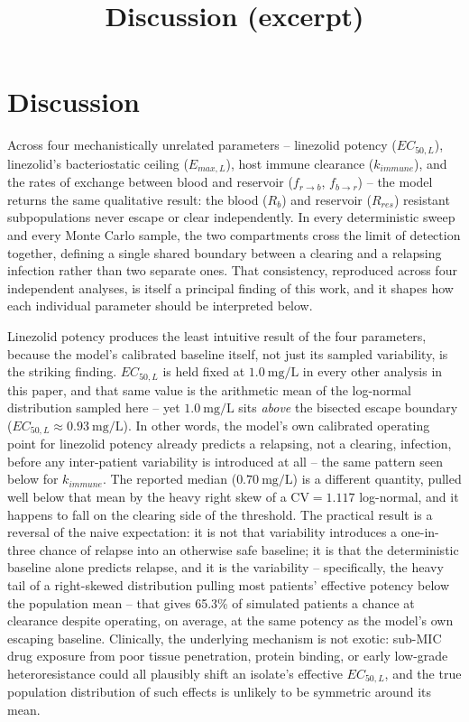 \documentclass[11pt]{article}
\title{Discussion (excerpt)}
\author{}
\date{}
\begin{document}
\maketitle

\section{Discussion}

Across four mechanistically unrelated parameters -- linezolid potency
($EC_{50,L}$), linezolid's bacteriostatic ceiling ($E_{max,L}$), host
immune clearance ($k_{immune}$), and the rates of exchange between blood and
reservoir ($f_{r \to b}$, $f_{b \to r}$) -- the model returns the same
qualitative result: the blood ($R_b$) and reservoir ($R_{res}$) resistant
subpopulations never escape or clear independently. In every deterministic
sweep and every Monte Carlo sample, the two compartments cross the limit of
detection together, defining a single shared boundary between a clearing and
a relapsing infection rather than two separate ones. That consistency,
reproduced across four independent analyses, is itself a principal finding
of this work, and it shapes how each individual parameter should be
interpreted below.

Linezolid potency produces the least intuitive result of the four
parameters, because the model's calibrated baseline itself, not just its
sampled variability, is the striking finding. $EC_{50,L}$ is held fixed at
$1.0~\mathrm{mg/L}$ in every other analysis in this paper, and that same
value is the arithmetic mean of the log-normal distribution sampled here --
yet $1.0~\mathrm{mg/L}$ sits \emph{above} the bisected escape boundary
($EC_{50,L} \approx 0.93~\mathrm{mg/L}$). In other words, the model's own
calibrated operating point for linezolid potency already predicts a
relapsing, not a clearing, infection, before any inter-patient variability
is introduced at all -- the same pattern seen below for $k_{immune}$. The
reported median ($0.70~\mathrm{mg/L}$) is a different quantity, pulled well
below that mean by the heavy right skew of a $\mathrm{CV}=1.117$ log-normal,
and it happens to fall on the clearing side of the threshold. The practical
result is a reversal of the naive expectation: it is not that variability
introduces a one-in-three chance of relapse into an otherwise safe baseline;
it is that the deterministic baseline alone predicts relapse, and it is the
variability -- specifically, the heavy tail of a right-skewed distribution
pulling most patients' effective potency below the population mean -- that
gives 65.3\% of simulated patients a chance at clearance despite operating,
on average, at the same potency as the model's own escaping baseline.
Clinically, the underlying mechanism is not exotic: sub-MIC drug exposure
from poor tissue penetration, protein binding, or early low-grade
heteroresistance could all plausibly shift an isolate's effective
$EC_{50,L}$, and the true population distribution of such effects is
unlikely to be symmetric around its mean.
\end{document}
